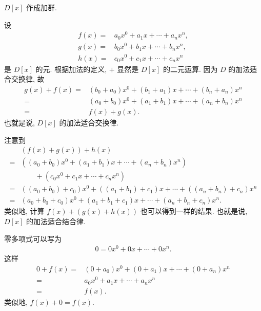 \begin{proposition}
    $D[x]$ 作成加群.
\end{proposition}

\begin{pf}
    设
    \begin{align*}
        f(x) = {} & a_0 x^0 + a_1 x + \cdots + a_n x^n, \\
        g(x) = {} & b_0 x^0 + b_1 x + \cdots + b_n x^n, \\
        h(x) = {} & c_0 x^0 + c_1 x + \cdots + c_n x^n
    \end{align*}
    是 $D[x]$ 的元. 根据加法的定义, $+$ 显然是 $D[x]$ 的二元运算. 因为 $D$ 的加法适合交换律, 故
    \begin{align*}
        g(x) + f(x)
        = {} & (b_0 + a_0) x^0 + (b_1 + a_1) x + \cdots + (b_n + a_n) x^n \\
        = {} & (a_0 + b_0) x^0 + (a_1 + b_1) x + \cdots + (a_n + b_n) x^n \\
        = {} & f(x) + g(x).
    \end{align*}
    也就是说, $D[x]$ 的加法适合交换律.

    注意到
    \begin{align*}
             & (f(x) + g(x)) + h(x)                                                               \\
        = {} & ((a_0 + b_0) x^0 + (a_1 + b_1) x + \cdots + (a_n + b_n) x^n)                       \\
             & \qquad + (c_0 x^0 + c_1 x + \cdots + c_n x^n)                                      \\
        = {} & ((a_0 + b_0) + c_0) x^0 + ((a_1 + b_1) + c_1) x + \cdots + ((a_n + b_n) + c_n) x^n \\
        = {} & (a_0 + b_0 + c_0) x^0 + (a_1 + b_1 + c_1) x + \cdots + (a_n + b_n + c_n) x^n.
    \end{align*}
    类似地, 计算 $f(x) + (g(x) + h(x))$ 也可以得到一样的结果. 也就是说, $D[x]$ 的加法适合结合律.

    零多项式可以写为
    \begin{align*}
        0 = 0x^0 + 0x + \cdots + 0x^n.
    \end{align*}
    这样
    \begin{align*}
        0 + f(x)
        = {} & (0 + a_0) x^0 + (0 + a_1) x + \cdots + (0 + a_n) x^n \\
        = {} & a_0 x^0 + a_1 x + \cdots + a_n x^n                   \\
        = {} & f(x).
    \end{align*}
    类似地, $f(x) + 0 = f(x)$.


\end{pf}
